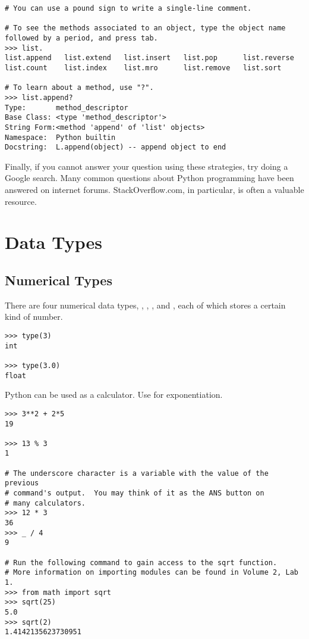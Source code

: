 \begin{lstlisting}
# You can use a pound sign to write a single-line comment.

# To see the methods associated to an object, type the object name followed by a period, and press tab.
>>> list.
list.append   list.extend   list.insert   list.pop      list.reverse  
list.count    list.index    list.mro      list.remove   list.sort

# To learn about a method, use "?".
>>> list.append?
Type:       method_descriptor
Base Class: <type 'method_descriptor'>
String Form:<method 'append' of 'list' objects>
Namespace:  Python builtin
Docstring:  L.append(object) -- append object to end
\end{lstlisting}

Finally, if you cannot answer your question using these strategies, try doing a Google search.  Many common questions about Python programming have been answered on internet forums.  StackOverflow.com, in particular, is often a valuable resource.

\section*{Data Types}


\subsection*{Numerical Types}
There are four numerical data types, , , 
, and , each of which stores a certain kind of number. 

\begin{lstlisting}
>>> type(3)
int

>>> type(3.0)
float
\end{lstlisting}

Python can be used as a calculator. Use \li{**} for exponentiation.
\begin{lstlisting}
>>> 3**2 + 2*5
19

>>> 13 % 3
1

# The underscore character is a variable with the value of the previous
# command's output.  You may think of it as the ANS button on 
# many calculators.
>>> 12 * 3
36
>>> _ / 4
9

# Run the following command to gain access to the sqrt function.
# More information on importing modules can be found in Volume 2, Lab 1.
>>> from math import sqrt
>>> sqrt(25)
5.0
>>> sqrt(2)
1.4142135623730951
\end{lstlisting}

